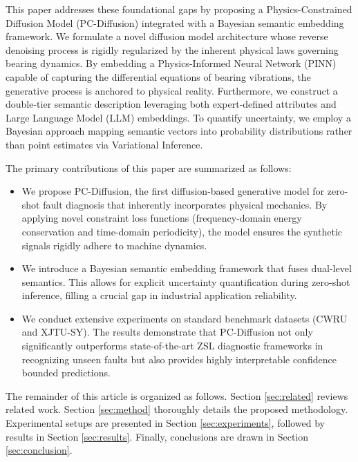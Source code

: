 This paper addresses these foundational gaps by proposing a Physics-Constrained Diffusion Model (PC-Diffusion) integrated with a Bayesian semantic embedding framework. We formulate a novel diffusion model architecture whose reverse denoising process is rigidly regularized by the inherent physical laws governing bearing dynamics. By embedding a Physics-Informed Neural Network (PINN) capable of capturing the differential equations of bearing vibrations, the generative process is anchored to physical reality. Furthermore, we construct a double-tier semantic description leveraging both expert-defined attributes and Large Language Model (LLM) embeddings. To quantify uncertainty, we employ a Bayesian approach mapping semantic vectors into probability distributions rather than point estimates via Variational Inference. 

The primary contributions of this paper are summarized as follows:
\begin{itemize}
    \item We propose PC-Diffusion, the first diffusion-based generative model for zero-shot fault diagnosis that inherently incorporates physical mechanics. By applying novel constraint loss functions (frequency-domain energy conservation and time-domain periodicity), the model ensures the synthetic signals rigidly adhere to machine dynamics.
    \item We introduce a Bayesian semantic embedding framework that fuses dual-level semantics. This allows for explicit uncertainty quantification during zero-shot inference, filling a crucial gap in industrial application reliability.
    \item We conduct extensive experiments on standard benchmark datasets (CWRU and XJTU-SY). The results demonstrate that PC-Diffusion not only significantly outperforms state-of-the-art ZSL diagnostic frameworks in recognizing unseen faults but also provides highly interpretable confidence bounded predictions.
\end{itemize}

The remainder of this article is organized as follows. Section \ref{sec:related} reviews related work. Section \ref{sec:method} thoroughly details the proposed methodology. Experimental setups are presented in Section \ref{sec:experiments}, followed by results in Section \ref{sec:results}. Finally, conclusions are drawn in Section \ref{sec:conclusion}.

